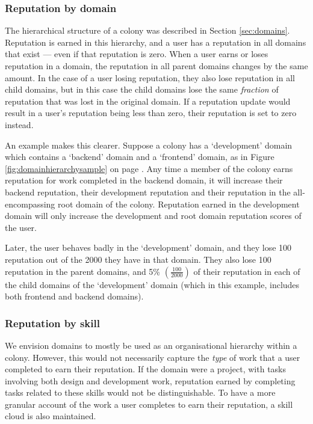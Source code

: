 \subsubsection*{Reputation by domain}\label{sec:rep-by-domain}

The hierarchical structure of a colony was described in Section \ref{sec:domains}. Reputation is earned in this hierarchy, and a user has a reputation in all domains that exist --- even if that reputation is zero. When a user earns or loses reputation in a domain, the reputation in all parent domains changes by the same amount. In the case of a user losing reputation, they also lose reputation in all child domains, but in this case the child domains lose the same \textit{fraction} of reputation that was lost in the original domain. If a reputation update would result in a user's reputation being less than zero, their reputation is set to zero instead.

An example makes this clearer. Suppose a colony has a `development' domain which contains a `backend' domain and a `frontend' domain, as in Figure \ref{fig:domainhierarchysample} on page \pageref{fig:domainhierarchysample}. Any time a member of the colony earns reputation for work completed in the backend domain, it will increase their backend reputation, their development reputation and their reputation in the all-encompassing root domain of the colony. Reputation earned in the development domain will only increase the development and root domain reputation scores of the user.

Later, the user behaves badly in the `development' domain, and they lose 100 reputation out of the 2000 they have in that domain. They also lose 100 reputation in the parent domains, and 5\% $\left(\frac{100}{2000}\right)$ of their reputation in each of the child domains of the `development' domain (which in this example, includes both frontend and backend domains).

\subsubsection*{Reputation by skill}\label{sec:rep-by-skill}

We envision domains to mostly be used as an organisational hierarchy within a colony. However, this would not necessarily capture the \emph{type} of work that a user completed to earn their reputation. If the domain were a project, with tasks involving both design and development work, reputation earned by completing tasks related to these skills would not be distinguishable. To have a more granular account of the work a user completes to earn their reputation, a skill cloud is also maintained.

